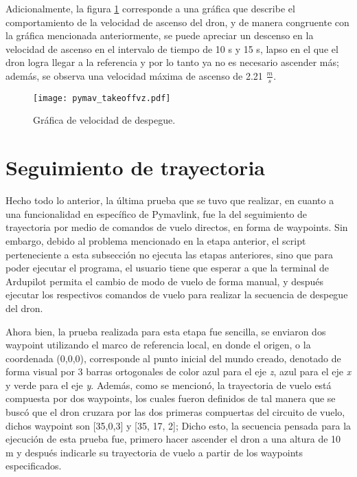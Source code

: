 Adicionalmente, la figura \ref{fig:pymav_takeoffvz} corresponde a una gráfica que describe el comportamiento de la velocidad de ascenso del dron, y de manera congruente con la gráfica mencionada anteriormente, se puede apreciar un descenso en la velocidad de ascenso en el intervalo de tiempo de 10 s y 15 s, lapso en el que el dron logra llegar a la referencia y por lo tanto ya no es necesario ascender más;  además, se observa una velocidad máxima de ascenso de 2.21 $\frac{m}{s}$.

\begin{figure}[ht]
    \centering
    \texttt{[image: pymav\_takeoffvz.pdf]}
    \caption{Gráfica de velocidad de despegue.}
    \label{fig:pymav_takeoffvz}
\end{figure}

\section{Seguimiento de trayectoria}

Hecho todo lo anterior, la última prueba que se tuvo que realizar, en cuanto a una funcionalidad en específico de Pymavlink, fue la del seguimiento de trayectoria por medio de comandos de vuelo directos, en forma de waypoints. Sin embargo, debido al problema mencionado en la etapa anterior, el script perteneciente a esta subsección no ejecuta las etapas anteriores, sino que para poder ejecutar el programa, el usuario tiene que esperar a que la terminal de Ardupilot permita el cambio de modo de vuelo de forma manual, y después ejecutar los respectivos comandos de vuelo para realizar la secuencia de despegue del dron.

Ahora bien, la prueba realizada para esta etapa fue sencilla, se enviaron dos waypoint utilizando el marco de referencia local, en donde el origen, o la coordenada (0,0,0), corresponde al punto inicial del mundo creado, denotado de forma visual por 3 barras ortogonales de color azul para el eje \textit{z}, azul para el eje \textit{x} y verde para el eje \textit{y}. Además, como se mencionó, la trayectoria de vuelo está compuesta por dos waypoints, los cuales fueron definidos de tal manera que se buscó que el dron cruzara por las dos primeras compuertas del circuito de vuelo, dichos waypoint son [35,0,3] y [35, 17, 2]; Dicho esto, la secuencia pensada para la ejecución de esta prueba fue, primero hacer ascender el dron a una altura de 10 m y después indicarle su trayectoria de vuelo a partir de los waypoints especificados. 

